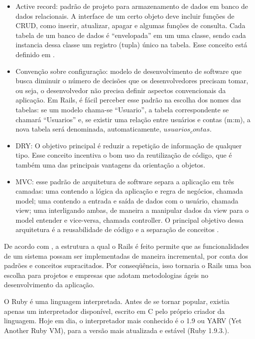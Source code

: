 \begin{itemize}
\item Active record: padrão de projeto para armazenamento de dados em banco de dados relacionais.  A interface de um certo objeto deve incluir funções de \ac{CRUD},  como inserir, atualizar, apagar e algumas funções de consulta. Cada tabela de um banco de dados é ``envelopada''  em um uma classe, sendo cada instancia dessa classe um registro (tupla) único na tabela.  Esse conceito está definido em \cite{fowler}.
\item Convenção sobre configuração: modelo de desenvolvimento de software que busca diminuir o número de decisões que os desenvolvedores precisam tomar, ou seja, o desenvolvedor não precisa definir aspectos convencionais da aplicação. Em Rails, é fácil perceber esse padrão na escolha dos nomes das tabelas: se um modelo chama-se ``Usuario'', a tabela correspondente se chamará ``Usuarios'' e, se existir uma relação entre usuários e contas (m:m), a nova tabela será denominada, automaticamente, $usuarios_contas$.
\item \ac{DRY}: O objetivo principal é reduzir a repetição de informação de qualquer tipo. Esse conceito incentiva o bom uso da reutilização de código, que é também uma das principais vantagens da orientação a objetos.
\item \ac{MVC}: esse padrão de arquitetura de software separa a aplicação em três camadas: uma contendo a lógica da aplicação e regra de negócios, chamada model; uma contendo a entrada e saída de dados com o usuário, chamada view; uma interligando ambas, de maneira a manipular dados da view para o model entender e vice-versa, chamada controller. O principal objetivo dessa arquitetura é a reusabilidade de código e a separação de conceitos \cite{mvc}.
\end{itemize}


 	De acordo com \cite{caelum}, a estrutura a qual o Rails é feito permite que as funcionalidades de um sistema possam ser implementadas de maneira incremental, por conta dos padrões e conceitos supracitados. Por conseqüência, isso tornaria o Rails uma boa escolha para projetos e empresas que adotam metodologias ágeis no desenvolvimento da aplicação.

 	O Ruby é uma linguagem interpretada. Antes de se tornar popular, existia apenas um interpretador disponível, escrito em C pelo próprio criador da linguagem. Hoje em dia, o interpretador mais conhecido é o 1.9 ou YARV (Yet Another Ruby VM), para a versão mais atualizada e estável (Ruby 1.9.3.).
 	
